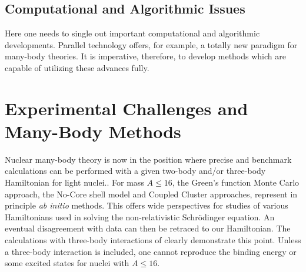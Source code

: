 \subsection{Computational and Algorithmic Issues}

Here one needs to single out important computational and 
algorithmic developments.  
Parallel technology offers, for example, a totally new paradigm
for many-body theories. It is imperative, therefore, 
to develop methods which are capable
of utilizing these advances fully.  


\section{Experimental Challenges and Many-Body Methods} 


Nuclear many-body theory is now in the position
where precise and benchmark calculations can be performed with a given
two-body and/or three-body Hamiltonian  for light nuclei.. 
For mass $A\le 16$, the Green's function Monte Carlo
approach, the No-Core shell model and Coupled 
Cluster approaches,
represent in principle {\it ab initio} methods. 
This offers wide perspectives for studies
of various Hamiltonians used in  solving the 
non-relativistic Schr\"odinger
equation. An eventual disagreement with data can 
then be retraced to our Hamiltonian.
The calculations with three-body interactions of 
clearly demonstrate this point. Unless a three-body 
interaction is included, one cannot  reproduce the binding 
energy or some excited states for nuclei with $A\le 16$. 


